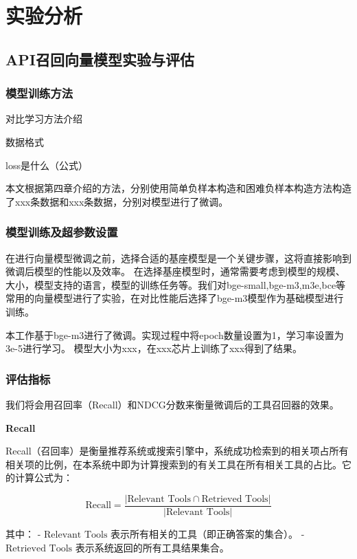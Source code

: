 \chapter{实验分析}

\section{API召回向量模型实验与评估}

\subsection{模型训练方法}

对比学习方法介绍

数据格式

loss是什么（公式）

本文根据第四章介绍的方法，分别使用简单负样本构造和困难负样本构造方法构造了xxx条数据和xxx条数据，分别对模型进行了微调。

\subsection{模型训练及超参数设置}

在进行向量模型微调之前，选择合适的基座模型是一个关键步骤，这将直接影响到微调后模型的性能以及效率。
在选择基座模型时，通常需要考虑到模型的规模、大小，模型支持的语言，模型的训练任务等。我们对bge-small,bge-m3,m3e,bce等
常用的向量模型进行了实验，在对比性能后选择了bge-m3模型作为基础模型进行训练。

本工作基于bge-m3进行了微调。实现过程中将epoch数量设置为1，学习率设置为3e-5进行学习。
模型大小为xxx，在xxx芯片上训练了xxx得到了结果。

\subsection{评估指标}

我们将会用召回率（Recall）和NDCG分数来衡量微调后的工具召回器的效果。

\textbf{Recall}

Recall（召回率）是衡量推荐系统或搜索引擎中，系统成功检索到的相关项占所有相关项的比例，在本系统中即为计算搜索到的有关工具在所有相关工具的占比。它的计算公式为：

\[
\text{Recall} = \frac{|\text{Relevant Tools} \cap \text{Retrieved Tools}|}{|\text{Relevant Tools}|}
\]

其中：
- \(\text{Relevant Tools}\) 表示所有相关的工具（即正确答案的集合）。
- \(\text{Retrieved Tools}\) 表示系统返回的所有工具结果集合。

